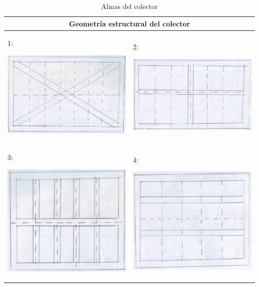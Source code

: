 \begin{table}[H]
	\centering
	\caption{Almas del colector}
	\begin{tabular}{@{}|p{7cm}|p{7cm}|} 
		\hline
		\multicolumn{2}{|c|}{\textbf{Geometría estructural del colector}} \\
		\hline \hline
		1:
		\begin{center}
			\includegraphics[width=6.5cm]{imagenes/alma1}
		\end{center}
		& 
		2:
		\begin{center}
			\includegraphics[width=6.5cm]{imagenes/alma2}
		\end{center}
		\\ \hline
		3:
		\begin{center}
			\includegraphics[width=6.5cm]{imagenes/alma3}
		\end{center}
		&
		4:
		\begin{center}
			\includegraphics[width=6.5cm]{imagenes/alma4}

\end{center}
\end{tabular}
\end{table}
